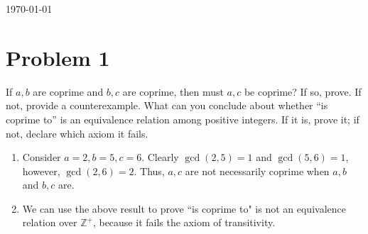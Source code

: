 \documentclass[hidelinks,12pt]{article}
\newcommand{\Z}{\mathbb{Z}}
\begin{document}
\begin{titlepage}
	
	\vfill\vfill\vfill %
	
	{\large\today} %
	
	
	 
	
	\vfill %
	
\end{titlepage}
\section{Problem 1}
If $a,b$ are coprime and $b,c$ are coprime, then must $a,c$ be coprime? If so, prove. If not, provide a counterexample. What can you conclude about whether ``is coprime to'' is an equivalence relation among positive integers. If it is, prove it; if not, declare which axiom it fails.\begin{enumerate}[label=(\alph*)]
    \item Consider $a=2,b=5,c=6$. Clearly $\gcd(2,5)=1$ and $\gcd(5,6)=1$, however, $\gcd(2,6)=2$. Thus, $a,c$ are not necessarily coprime when $a,b$ and $b,c$ are.
    \item We can use the above result to prove ``is coprime to" is not an equivalence relation over $\Z^+$, because it fails the axiom of transitivity.
\end{enumerate}
\end{document}
